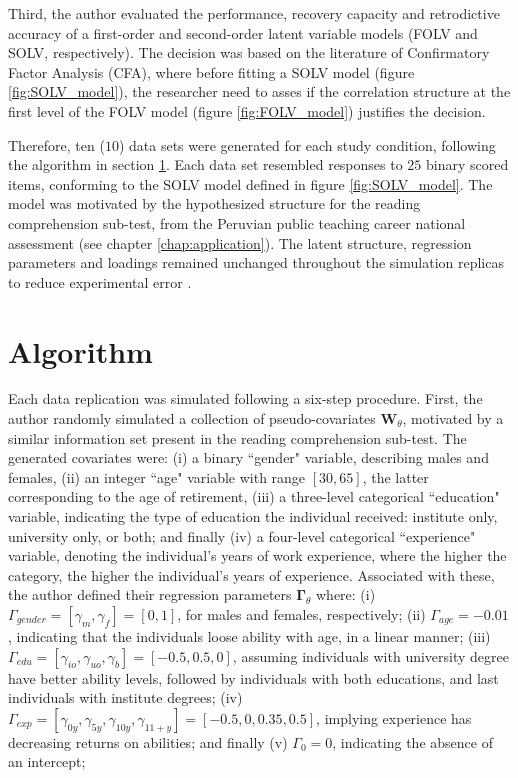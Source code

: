 Third, the author evaluated the performance, recovery capacity and retrodictive accuracy of a first-order and second-order latent variable models (FOLV and SOLV, respectively). The decision was based on the literature of Confirmatory Factor Analysis (CFA), where before fitting a SOLV model (figure \ref{fig:SOLV_model}), the researcher need to asses if the correlation structure at the first level of the FOLV model (figure \ref{fig:FOLV_model}) justifies the decision.

Therefore, ten ($10$) data sets were generated for each study condition, following the algorithm in section \ref{sub_sect:algorithm}. Each data set resembled responses to $25$ binary scored items, conforming to the SOLV model defined in figure \ref{fig:SOLV_model}. The model was motivated by the hypothesized structure for the reading comprehension sub-test, from the Peruvian public teaching career national assessment (see chapter \ref{chap:application}). The latent structure, regression parameters and loadings remained unchanged throughout the simulation replicas to reduce experimental error \cite{Kieftenbeld_et_al_2012}. 


\section{Algorithm} \label{sub_sect:algorithm}

Each data replication was simulated following a six-step procedure. First, the author randomly simulated a collection of pseudo-covariates $\mathbf{W}_{\theta}$, motivated by a similar information set present in the reading comprehension sub-test. The generated covariates were: (i) a binary ``gender" variable, describing males and females, (ii) an integer ``age" variable with range $[30, 65]$, the latter corresponding to the age of retirement, (iii) a three-level categorical ``education" variable, indicating the type of education the individual received: institute only, university only, or both; and finally (iv) a four-level categorical ``experience" variable, denoting the individual's years of work experience, where the higher the category, the higher the individual's years of experience. Associated with these, the author defined their regression parameters $\mathbf{\Gamma}_{\theta}$ where: (i) $\Gamma_{gender} = [\gamma_{m}, \gamma_{f}] = [0, 1]$, for males and females, respectively; (ii) $\Gamma_{age} = -0.01$, indicating that the individuals loose ability with age, in a linear manner; (iii) $\Gamma_{edu} = [\gamma_{io}, \gamma_{uo}, \gamma_{b}] = [-0.5, 0.5, 0]$, assuming individuals with university degree have better ability levels, followed by individuals with both educations, and last individuals with institute degrees; (iv) $\Gamma_{exp} = [\gamma_{0y}, \gamma_{5y}, \gamma_{10y}, \gamma_{11+y}] = [-0.5, 0, 0.35, 0.5]$, implying experience has decreasing returns on abilities; and finally (v) $\Gamma_{0} = 0$, indicating the absence of an intercept;  

